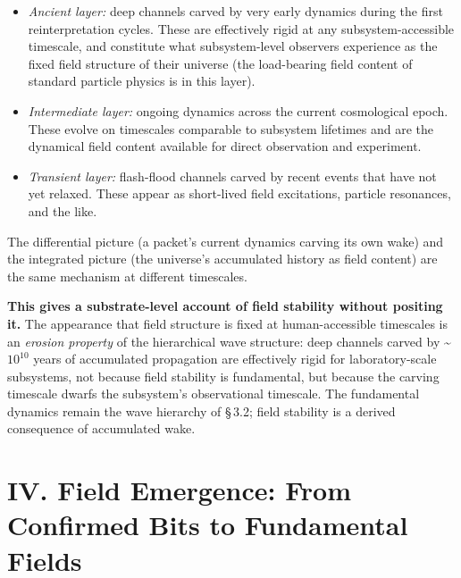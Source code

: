 \documentclass[11pt,oneside]{report}
\theoremstyle{definition}
\theoremstyle{remark}
\begin{document}
\begin{itemize}
\item
  \emph{Ancient layer:} deep channels carved by very early dynamics
  during the first reinterpretation cycles. These are effectively rigid
  at any subsystem-accessible timescale, and constitute what
  subsystem-level observers experience as the fixed field structure of
  their universe (the load-bearing field content of standard particle
  physics is in this layer).
\end{itemize}

\begin{itemize}
\item
  \emph{Intermediate layer:} ongoing dynamics across the current
  cosmological epoch. These evolve on timescales comparable to subsystem
  lifetimes and are the dynamical field content available for direct
  observation and experiment.
\end{itemize}

\begin{itemize}
\item
  \emph{Transient layer:} flash-flood channels carved by recent events
  that have not yet relaxed. These appear as short-lived field
  excitations, particle resonances, and the like.
\end{itemize}

The differential picture (a packet's current dynamics carving its own
wake) and the integrated picture (the universe's accumulated history as
field content) are the same mechanism at different timescales.

\textbf{This gives a substrate-level account of field stability without
positing it.} The appearance that field structure is fixed at
human-accessible timescales is an \emph{erosion property} of the
hierarchical wave structure: deep channels carved by \textasciitilde\ensuremath{10^{10}}
years of accumulated propagation are effectively rigid for
laboratory-scale subsystems, not because field stability is fundamental,
but because the carving timescale dwarfs the subsystem's observational
timescale. The fundamental dynamics remain the wave hierarchy of \S\,3.2;
field stability is a derived consequence of accumulated wake.

\section*{IV. Field Emergence: From Confirmed Bits to Fundamental Fields}
\end{document}
